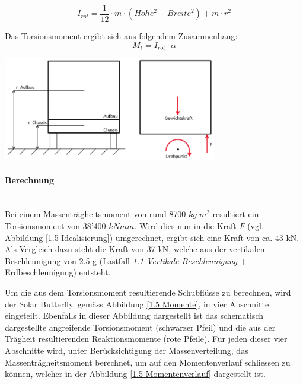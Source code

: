 \begin{equation}
  I_{rot} = \frac{1}{12} \cdot m \cdot \left(H\ddot{o}he^2 + Breite^2\right) + m \cdot r^2
\end{equation}

Das Torsionsmoment ergibt sich aus folgendem Zusammenhang:
\begin{equation}
  M_t = I_{rot} \cdot \alpha
\end{equation}

\begin{center}
  \includegraphics[width=0.7\textwidth]{04_Figures/1.5 Idealisierung.png}
  \label{1.5 Idealisierung}
\end{center}

\paragraph{Berechnung}\mbox{}\\
Bei einem Massenträgheitsmoment von rund 8700 $kg\;m^2$ resultiert ein Torsionsmoment von 38'400 $kNmm$. Wird dies nun in die Kraft $F$ (vgl. Abbildung \ref{1.5 Idealisierung}) umgerechnet, ergibt sich eine Kraft von ca. 43 kN. Als Vergleich dazu steht die Kraft von 37 kN, welche aus der vertikalen Beschleunigung von 2.5 g (Lastfall \emph{1.1 Vertikale Beschleunigung} + Erdbeschleunigung) entsteht.

Um die aus dem Torsionsmoment resultierende Schubflüsse zu berechnen, wird der Solar Butterfly, gemäss Abbildung \ref{1.5 Momente}, in vier Abschnitte eingeteilt. Ebenfalls in dieser Abbildung dargestellt ist das schematisch dargestellte angreifende Torsionsmoment (schwarzer Pfeil) und die aus der Trägheit resultierenden Reaktionsmomente (rote Pfeile). Für jeden dieser vier Abschnitte wird, unter Berücksichtigung der Massenverteilung, das Massenträgheitsmoment berechnet, um auf den Momentenverlauf schliessen zu können, welcher in der Abbildung \ref{1.5 Momentenverlauf} dargestellt ist.

